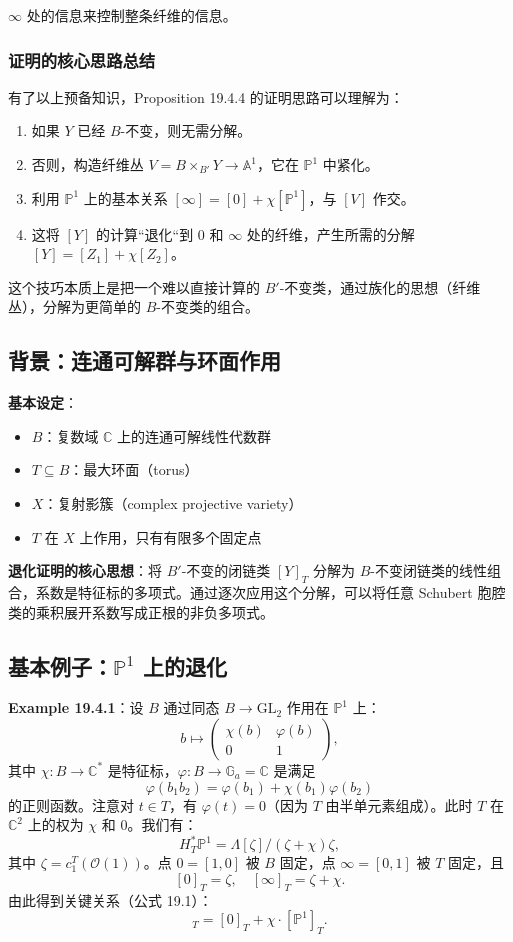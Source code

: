 $\infty$ 处的信息来控制整条纤维的信息。\subsubsection{证明的核心思路总结}有了以上预备知识，Proposition 19.4.4 的证明思路可以理解为：
\begin{enumerate}
\item 如果 $Y$ 已经 $B$-不变，则无需分解。\item 否则，构造纤维丛 $V = B \times_{B'} Y \to \mathbb{A}^1$，它在 $\mathbb{P}^1$ 中紧化。\item 利用 $\mathbb{P}^1$ 上的基本关系 $[\infty] = [0] + \chi[\mathbb{P}^1]$，与 $[V]$ 作交。\item 这将 $[Y]$ 的计算``退化``到 $0$ 和 $\infty$ 处的纤维，产生所需的分解 $[Y] = [Z_1] + \chi[Z_2]$。
\end{enumerate}这个技巧本质上是把一个难以直接计算的 $B'$-不变类，通过族化的思想（纤维丛），分解为更简单的 $B$-不变类的组合。
\subsection{背景：连通可解群与环面作用}\textbf{基本设定}：
\begin{itemize}
\item $B$：复数域 $\mathbb{C}$ 上的连通可解线性代数群\item $T \subseteq B$：最大环面（torus）\item $X$：复射影簇（complex projective variety）\item $T$ 在 $X$ 上作用，只有有限多个固定点
\end{itemize}

\textbf{退化证明的核心思想}：将 $B'$-不变的闭链类 $[Y]_T$ 分解为 $B$-不变闭链类的线性组合，系数是特征标的多项式。通过逐次应用这个分解，可以将任意 Schubert 胞腔类的乘积展开系数写成正根的非负多项式。
\subsection{基本例子：$\mathbb{P}^1$ 上的退化}\textbf{Example 19.4.1}：设 $B$ 通过同态 $B \to \mathrm{GL}_2$ 作用在 $\mathbb{P}^1$ 上：\[b \mapsto 
\begin{pmatrix} \chi(b) & \varphi(b) \\ 0 & 1 
\end{pmatrix},\]其中 $\chi: B \to \mathbb{C}^*$ 是特征标，$\varphi: B \to \mathbb{G}_a = \mathbb{C}$ 是满足\[\varphi(b_1 b_2) = \varphi(b_1) + \chi(b_1)\varphi(b_2)\]的正则函数。注意对 $t \in T$，有 $\varphi(t) = 0$（因为 $T$ 由半单元素组成）。此时 $T$ 在 $\mathbb{C}^2$ 上的权为 $\chi$ 和 $0$。我们有：\[H_T^* \mathbb{P}^1 = \Lambda[\zeta]/(\zeta + \chi)\zeta,\]其中 $\zeta = c_1^T(\mathcal{O}(1))$。点 $0 = [1,0]$ 被 $B$ 固定，点 $\infty = [0,1]$ 被 $T$ 固定，且\[[0]_T = \zeta, \quad [\infty]_T = \zeta + \chi.\]由此得到关键关系（公式 19.1）：
\begin{equation}[\infty]_T = [0]_T + \chi \cdot [\mathbb{P}^1]_T.
\label{eq:P1InfinityZeroRelation}
\end{equation}
